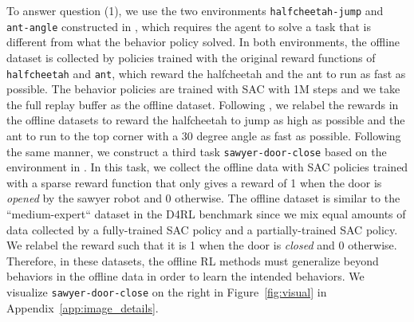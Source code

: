 \begin{table}
\centering
\scriptsize
{}
\vspace{-0.2cm}
\caption{
\footnotesize Average returns of \texttt{halfcheetah-jump} and \texttt{ant-angle} and average success rate of \texttt{sawyer-door-close} that require out-of-distribution generalization. All results are averaged over 3 random seeds. We include the mean and max undiscounted return / success rate of the episodes in the batch data (under Batch Mean and Batch Max, respectively) for comparison.
}
\vspace{-0.3cm}
\label{tbl:generalize}
\normalsize
\end{table}

To answer question (1), we use the two environments \texttt{halfcheetah-jump} and \texttt{ant-angle} constructed in \citet{yu2020mopo}, which requires the agent to solve a task that is different from what the behavior policy solved. In both environments, the offline dataset is collected by policies trained with the original reward functions of \texttt{halfcheetah} and \texttt{ant}, which reward the halfcheetah and the ant to run as fast as possible. The behavior policies are trained with SAC with 1M steps and we take the full replay buffer as the offline dataset. Following \citet{yu2020mopo}, we relabel the rewards in the offline datasets to reward the halfcheetah to jump as high as possible and the ant to run to the top corner with a 30 degree angle as fast as possible. Following the same manner, we construct a third task \texttt{sawyer-door-close} based on the environment in \citet{yu2020meta, Rafailov2020LOMPO}. In this task, we collect the offline data with SAC policies trained with a sparse reward function that only gives a reward of 1 when the door is \textit{opened} by the sawyer robot and 0 otherwise. The offline dataset is similar to the ``medium-expert`` dataset in the D4RL benchmark since we mix equal amounts of data collected by a fully-trained SAC policy and a partially-trained SAC policy. We relabel the reward such that it is 1 when the door is \textit{closed} and 0 otherwise. Therefore, in these datasets, the offline RL methods must generalize beyond behaviors in the offline data in order to learn the intended behaviors. We visualize \texttt{sawyer-door-close} on the right in Figure~\ref{fig:visual} in Appendix~\ref{app:image_details}.

